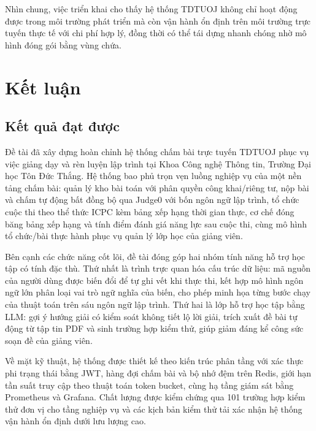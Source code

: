 \documentclass[12pt, a4paper]{report}
\begin{document}
Nhìn chung, việc triển khai cho thấy hệ thống TDTUOJ không chỉ hoạt động được trong môi
trường phát triển mà còn vận hành ổn định trên môi trường trực tuyến thực tế với chi phí
hợp lý, đồng thời có thể tái dựng nhanh chóng nhờ mô hình đóng gói bằng vùng chứa.

\chapter{Kết luận}

\section{Kết quả đạt được}

Đề tài đã xây dựng hoàn chỉnh hệ thống chấm bài trực tuyến TDTUOJ phục vụ việc giảng dạy
và rèn luyện lập trình tại Khoa Công nghệ Thông tin, Trường Đại học Tôn Đức Thắng. Hệ
thống bao phủ trọn vẹn luồng nghiệp vụ của một nền tảng chấm bài: quản lý kho bài toán với
phân quyền công khai/riêng tư, nộp bài và chấm tự động bất đồng bộ qua Judge0 với bốn
ngôn ngữ lập trình, tổ chức cuộc thi theo thể thức \ac{ICPC} kèm bảng xếp hạng
thời gian thực, cơ chế đóng băng bảng xếp hạng và tính điểm đánh giá năng lực sau cuộc
thi, cùng mô hình tổ chức/bài thực hành phục vụ quản lý lớp học của giảng viên.

Bên cạnh các chức năng cốt lõi, đề tài đóng góp hai nhóm tính năng hỗ trợ học tập có tính
đặc thù. Thứ nhất là trình trực quan hóa cấu trúc dữ liệu: mã nguồn của người dùng được
biến đổi để tự ghi vết khi thực thi, kết hợp mô hình ngôn ngữ lớn phân loại vai trò ngữ
nghĩa của biến, cho phép minh họa từng bước chạy của thuật toán trên sáu ngôn ngữ lập
trình. Thứ hai là lớp hỗ trợ học tập bằng \ac{LLM}: gợi ý hướng giải có kiểm soát không
tiết lộ lời giải, trích xuất đề bài tự động từ tập tin \ac{PDF} và sinh trường hợp kiểm
thử, giúp giảm đáng kể công sức soạn đề của giảng viên.

Về mặt kỹ thuật, hệ thống được thiết kế theo kiến trúc phân tầng với xác thực phi trạng
thái bằng \ac{JWT}, hàng đợi chấm bài và bộ nhớ đệm trên Redis, giới hạn tần suất truy cập
theo thuật toán token bucket, cùng hạ tầng giám sát bằng Prometheus và Grafana. Chất lượng
được kiểm chứng qua 101 trường hợp kiểm thử đơn vị cho tầng nghiệp vụ và các kịch bản kiểm thử tải
xác nhận hệ thống vận hành ổn định dưới lưu lượng cao.
\end{document}
